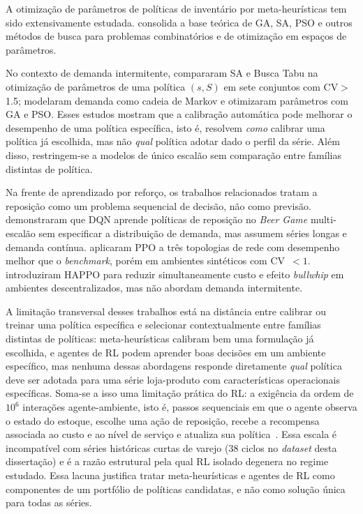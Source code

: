 A otimização de parâmetros de políticas de inventário por meta-heurísticas tem sido extensivamente estudada. \citet{Talbi2009Metaheuristics} consolida a base teórica de GA, SA, PSO e outros métodos de busca para problemas combinatórios e de otimização em espaços de parâmetros.

No contexto de demanda intermitente, \citet{Yuna2023IntermittentMetaheuristics} compararam SA e Busca Tabu na otimização de parâmetros de uma política $(s,S)$ em sete conjuntos com CV$>$1.5; \citet{Erkayman2025MarkovInventory} modelaram demanda como cadeia de Markov e otimizaram parâmetros com GA e PSO. Esses estudos mostram que a calibração automática pode melhorar o desempenho de uma política específica, isto é, resolvem \textit{como} calibrar uma política já escolhida, mas não \textit{qual} política adotar dado o perfil da série. Além disso, restringem-se a modelos de único escalão sem comparação entre famílias distintas de política.

Na frente de aprendizado por reforço, os trabalhos relacionados tratam a reposição como um problema sequencial de decisão, não como previsão. \citet{Oroojlooyjadid2022BeerGameDQN} demonstraram que DQN aprende políticas de reposição no \textit{Beer Game} multi-escalão sem especificar a distribuição de demanda, mas assumem séries longas e demanda contínua. \citet{Geevers2024MEIODRL} aplicaram PPO a três topologias de rede com desempenho melhor que o \textit{benchmark}, porém em ambientes sintéticos com CV~$<1$. \citet{Liu2024HAPPO} introduziram HAPPO para reduzir simultaneamente custo e efeito \textit{bullwhip} em ambientes descentralizados, mas não abordam demanda intermitente.

A limitação transversal desses trabalhos está na distância entre calibrar ou treinar uma política específica e selecionar contextualmente entre famílias distintas de políticas: meta-heurísticas calibram bem uma formulação já escolhida, e agentes de RL podem aprender boas decisões em um ambiente específico, mas nenhuma dessas abordagens responde diretamente \textit{qual} política deve ser adotada para uma série loja-produto com características operacionais específicas. Soma-se a isso uma limitação prática do RL: a exigência da ordem de $10^6$ interações agente-ambiente, isto é, passos sequenciais em que o agente observa o estado do estoque, escolhe uma ação de reposição, recebe a recompensa associada ao custo e ao nível de serviço e atualiza sua política~\citep{Oroojlooyjadid2022BeerGameDQN}. Essa escala é incompatível com séries históricas curtas de varejo (38 ciclos no \textit{dataset} desta dissertação) e é a razão estrutural pela qual RL isolado degenera no regime estudado. Essa lacuna justifica tratar meta-heurísticas e agentes de RL como componentes de um portfólio de políticas candidatas, e não como solução única para todas as séries.

